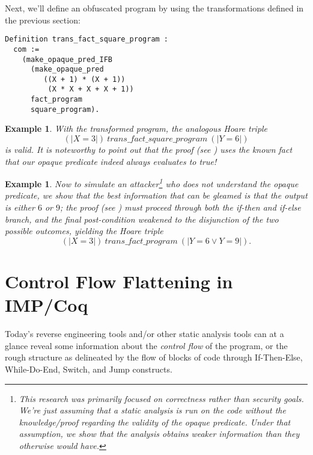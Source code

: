 \documentclass[compsoc,conference,a4paper,10pt,times]{IEEEtran}
\newtheorem{example}[theorem]{Example}
\begin{document}
Next, we'll define an obfuscated program by using the transformations defined in the previous section:


\begin{verbatim}
Definition trans_fact_square_program : 
  com :=
    (make_opaque_pred_IFB 
      (make_opaque_pred 
         ((X + 1) * (X + 1)) 
          (X * X + X + X + 1)) 
      fact_program 
      square_program).
\end{verbatim}

\begin{example}\label{hoare22}
With the transformed program, the analogous Hoare triple
\[(|X=3|)\ trans\_fact\_square\_program\ (|Y=6|)\]
is valid. It is noteworthy to point out that the proof (see \cite{Weyun}) uses the known fact that our opaque predicate indeed always evaluates to true!
\end{example}

\begin{example}\label{hoare23}
Now to simulate an attacker\footnote{This research was primarily focused on correctness rather than security goals.  We're just assuming that a static analysis is run on the code without the knowledge/proof regarding the validity of the opaque predicate.  Under that assumption, we show that the analysis obtains weaker information than they otherwise would have.} who does not understand the opaque predicate, we show that the best information that can be gleamed is that the output is either $6$ or $9$; the proof (see \cite{Weyun}) must proceed through both the if-then and if-else branch, and the final post-condition weakened to the disjunction of the two possible outcomes, yielding the Hoare triple
\[
(|X=3|)\ trans\_fact\_program\ (|Y=6 \lor Y=9|).
\]
\end{example}

\section{Control Flow Flattening in IMP/Coq}\label{sec:flattening}
Today's reverse engineering tools and/or other static analysis tools can at a glance reveal some information about the \emph{control flow} of the program, or the rough structure as delineated by the flow of blocks of code through If-Then-Else, While-Do-End, Switch, and Jump constructs. 

\end{document}
